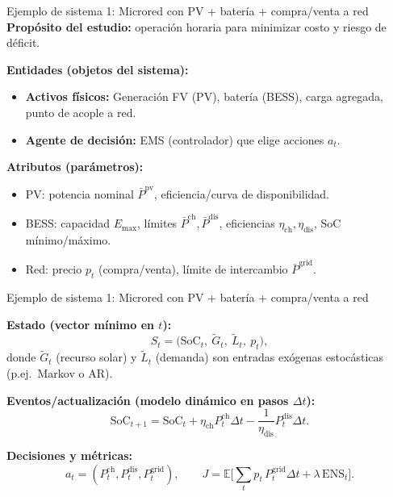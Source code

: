 \documentclass[aspectratio=1610, 9pt]{beamer}
\begin{document}
\begin{frame}{Ejemplo de sistema 1: Microred con PV + batería + compra/venta a red}
\textbf{Propósito del estudio:} operación horaria para minimizar costo y riesgo de déficit.

\medskip
\textbf{Entidades (objetos del sistema):}
\begin{itemize}
  \item \textbf{Activos físicos:} Generación FV (PV), batería (BESS), carga agregada, punto de acople a red.
  \item \textbf{Agente de decisión:} EMS (controlador) que elige acciones $a_t$.
\end{itemize}

\textbf{Atributos (parámetros):}
\begin{itemize}
  \item PV: potencia nominal $\bar P^{\text{pv}}$, eficiencia/curva de disponibilidad.
  \item BESS: capacidad $E_{\max}$, límites $\bar P^{\text{ch}},\bar P^{\text{dis}}$, eficiencias $\eta_{\text{ch}},\eta_{\text{dis}}$, SoC mínimo/máximo.
  \item Red: precio $p_t$ (compra/venta), límite de intercambio $\bar P^{\text{grid}}$.
\end{itemize}

\end{frame}

\begin{frame}{Ejemplo de sistema 1: Microred con PV + batería + compra/venta a red}

\textbf{Estado (vector mínimo en $t$):}
\[
S_t=\big(\text{SoC}_t,\ \tilde G_t,\ \tilde L_t,\ p_t\big),
\]
donde $\tilde G_t$ (recurso solar) y $\tilde L_t$ (demanda) son entradas exógenas estocásticas (p.ej.\ Markov o AR).

\textbf{Eventos/actualización (modelo dinámico en pasos $\Delta t$):}
\[
\text{SoC}_{t+1}=\text{SoC}_t+\eta_{\text{ch}}P^{\text{ch}}_t\Delta t-\frac{1}{\eta_{\text{dis}}}P^{\text{dis}}_t\Delta t.
\]

\textbf{Decisiones y métricas:}
\[
a_t=(P^{\text{ch}}_t,P^{\text{dis}}_t,P^{\text{grid}}_t),\qquad
J=\mathbb E\Big[\sum_t p_t\,P^{\text{grid}}_t\Delta t+\lambda\,\text{ENS}_t\Big].
\]
\end{frame}
\end{document}
